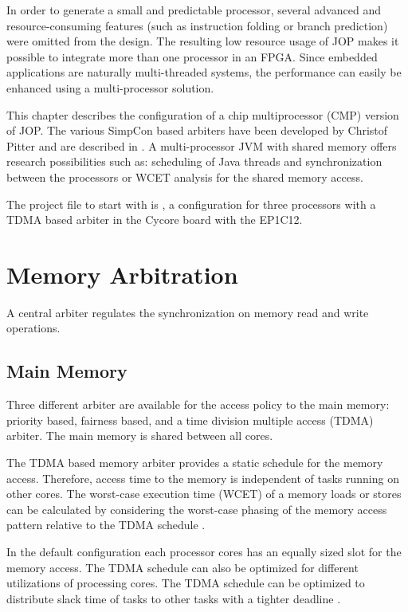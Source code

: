 
In order to generate a small and predictable processor, several
advanced and resource-consuming features (such as instruction folding
or branch prediction) were omitted from the design. The resulting low
resource usage of JOP makes it possible to integrate more than one
processor in an FPGA. Since embedded applications are naturally
multi-threaded systems, the performance can easily be enhanced using
a multi-processor solution.

This chapter describes the configuration of a chip multiprocessor
(CMP) version of JOP. The various SimpCon based arbiters have been
developed by Christof Pitter and are described in \cite{jop:dma,
jop:cmp, jop:cmp:eval}. A multi-processor JVM with shared memory
offers research possibilities such as: scheduling of Java threads and
synchronization between the processors or WCET analysis for the
shared memory access.

The project file to start with is , a configuration for
three processors with a TDMA based arbiter in the Cycore board with
the EP1C12.

\section{Memory Arbitration}

A central arbiter regulates the synchronization on memory read and
write operations.

\subsection{Main Memory}

Three different arbiter are available for the access policy to the
main memory: priority based, fairness based, and a time division
multiple access (TDMA) arbiter. The main memory is shared between all
cores.

The TDMA based memory arbiter provides a static schedule for the
memory access. Therefore, access time to the memory is independent of
tasks running on other cores. The worst-case execution time (WCET) of
a memory loads or stores can be calculated by considering the
worst-case phasing of the memory access pattern relative to the TDMA
schedule \cite{tdma:arbiter:jtres2008}.


In the default configuration each processor cores has an equally
sized slot for the memory access. The TDMA schedule can also be
optimized for different utilizations of processing cores. The TDMA
schedule can be optimized to distribute slack time of tasks to other
tasks with a tighter deadline \cite{jop:cmp:single:thread}.


